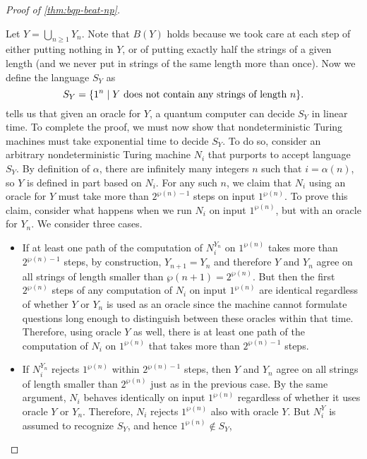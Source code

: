 \documentclass[12pt]{article}
\begin{document}
\begin{mdframed}
\begin{proof}[Proof of \cref{thm:bqp-beat-np}]
\begin{enumerate}
\begin{itemize}
      \end{itemize}
  \end{enumerate}
  Let $Y = \bigcup_{n\ge 1} Y_n$. Note that $B(Y)$ holds because we took care at
  each step of either putting nothing in $Y$, or of putting exactly half the
  strings of a given length (and we never put in strings of the same length more
  than once). Now we define the language $S_Y$ as
  $$
    S_Y = \curl*{1^n \mid
                 \mbox{$Y$ does not contain any strings of length $n$}}.
  $$
   tells us that given an oracle for $Y$, a quantum computer
  can decide $S_Y$ in linear time. To complete the proof, we must now show that
  nondeterministic Turing machines must take exponential time to decide $S_Y$.
  To do so, consider an arbitrary nondeterministic Turing machine $N_i$ that
  purports to accept language $S_Y$. By definition of $\alpha$, there are
  infinitely many integers $n$ such that $i = \alpha(n)$, so $Y$ is defined in
  part based on $N_i$. For any such $n$, we claim that $N_i$ using an oracle for
  $Y$ must take more than $2^{\wp(n)-1}$ steps on input $1^{\wp(n)}$. To prove
  this claim, consider what happens when we run $N_i$ on input $1^{\wp(n)}$, but
  with an oracle for $Y_n$. We consider three cases.
  \begin{itemize}
    \item If at least one path of the computation of $N_i^{Y_n}$ on $1^{\wp(n)}$
      takes more than $2^{\wp(n)-1}$ steps, by construction, $Y_{n+1} = Y_n$ and
      therefore $Y$ and $Y_n$ agree on all strings of length smaller than
      $\wp(n+1) = 2^{\wp(n)}$. But then the first $2^{\wp(n)}$ steps of any
      computation of $N_i$ on input $1^{\wp(n)}$ are identical regardless of
      whether $Y$ or $Y_n$ is used as an oracle since the machine cannot
      formulate questions long enough to distinguish between these oracles
      within that time. Therefore, using oracle $Y$ as well, there is at least
      one path of the computation of $N_i$ on $1^{\wp(n)}$ that takes more than
      $2^{\wp(n)-1}$ steps.
    \item If $N_i^{Y_n}$ rejects $1^{\wp(n)}$ within $2^{\wp(n)-1}$ steps, then
      $Y$ and $Y_n$ agree on all strings of length smaller than $2^{\wp(n)}$
      just as in the previous case. By the same argument, $N_i$ behaves
      identically on input $1^{\wp(n)}$ regardless of whether it uses oracle $Y$
      or $Y_n$. Therefore, $N_i$ rejects $1^{\wp(n)}$ also with oracle $Y$. But
      $N_i^Y$ is assumed to recognize $S_Y$, and hence $1^{\wp(n)} \not\in S_Y$,

\end{itemize}
\end{proof}
\end{mdframed}
\end{document}
